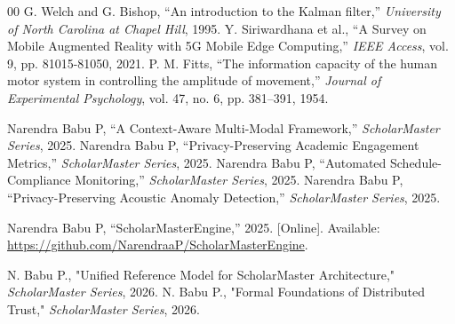 \documentclass[conference]{IEEEtran}
\begin{document}
\begin{thebibliography}{00}
 G. Welch and G. Bishop, ``An introduction to the Kalman filter,'' \textit{University of North Carolina at Chapel Hill}, 1995.
 Y. Siriwardhana et al., ``A Survey on Mobile Augmented Reality with 5G Mobile Edge Computing,'' \textit{IEEE Access}, vol. 9, pp. 81015-81050, 2021.
 P. M. Fitts, ``The information capacity of the human motor system in controlling the amplitude of movement,'' \textit{Journal of Experimental Psychology}, vol. 47, no. 6, pp. 381--391, 1954.

 Narendra Babu P, ``A Context-Aware Multi-Modal Framework,'' \textit{ScholarMaster Series}, 2025.
 Narendra Babu P, ``Privacy-Preserving Academic Engagement Metrics,'' \textit{ScholarMaster Series}, 2025.
 Narendra Babu P, ``Automated Schedule-Compliance Monitoring,'' \textit{ScholarMaster Series}, 2025.
 Narendra Babu P, ``Privacy-Preserving Acoustic Anomaly Detection,'' \textit{ScholarMaster Series}, 2025.

 Narendra Babu P, ``ScholarMasterEngine,'' 2025. [Online]. Available: \url{https://github.com/NarendraaP/ScholarMasterEngine}.


 N. Babu P., "Unified Reference Model for ScholarMaster Architecture," \textit{ScholarMaster Series}, 2026.
 N. Babu P., "Formal Foundations of Distributed Trust," \textit{ScholarMaster Series}, 2026.
\end{thebibliography}
\end{document}

